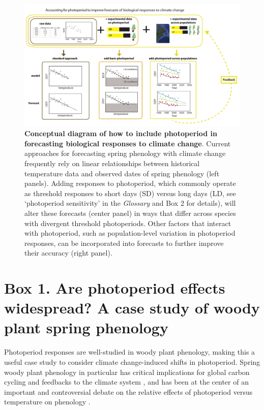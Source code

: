 \documentclass{article}
\begin{document}
\begin{figure}[h]
\includegraphics{..//..//analyses/photoperiod/figures/photocondiag6.pdf} 
\caption{\textbf{Conceptual diagram of how to include photoperiod in forecasting biological responses to climate change}. Current approaches for forecasting spring phenology with climate change frequently rely on linear relationships between historical temperature data and observed dates of spring phenology (left panels). Adding responses to photoperiod, which commonly operate as threshold responses to short days (SD) versus long days (LD, see `photoperiod sensitivity' in the \emph{Glossary} and Box 2 for details), will alter these forecasts (center panel) in ways that differ across species with divergent threshold photoperiods. Other factors that interact with photoperiod, such as population-level variation in photoperiod responses, can be incorporated into forecasts to further improve their accuracy (right panel).}
 \label{fig:condiag}
 \end{figure}
\clearpage

 
 \section*{Box 1. Are photoperiod effects widespread? A case study of woody plant spring phenology}
\par Photoperiod responses are well-studied in woody plant phenology, making this a useful case study to consider climate change-induced shifts in photoperiod. Spring woody plant phenology in particular has critical implications for global carbon cycling and feedbacks to the climate system \citep{richardson2013}, and has been at the center of an important and controversial debate on the relative effects of photoperiod versus temperature on phenology \citep[e.g.,][]{fu2019,chuine2010,koerner2010a,koerner2010b}. 
\end{document}
